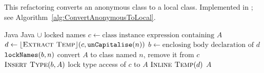 \subsection{}
This refactoring converts an anonymous class to a local class. Implemented in ; see Algorithm~\ref{alg:ConvertAnonymousToLocal}.


\begin{algorithm}[p]
\caption{$\refactoring{Convert Anonymous to Local}(A : \type{AnonymousClass}, n : \type{Name}) : \type{LocalClass}$}\label{alg:ConvertAnonymousToLocal}
\begin{algorithmic}[1]
\REQUIRE Java
\ENSURE Java $\cup$ locked names
\medskip
\STATE $c \leftarrow \text{class instance expression containing $A$}$
\STATE $d \leftarrow \lfloor\textsc{Extract Temp}\rfloor(c, \text{\texttt{unCapitalise}}(n))$
\STATE $b \leftarrow \text{enclosing body declaration of $d$}$
\STATE $\text{\texttt{lockNames}}(b, n)$
\STATE convert $A$ to class named $n$, remove it from $c$
\STATE $\textsc{Insert Type}(b, A)$
\STATE lock type access of $c$ to $A$
\STATE $\textsc{Inline Temp}(d)$
\RETURN $A$
\end{algorithmic}
\end{algorithm}
